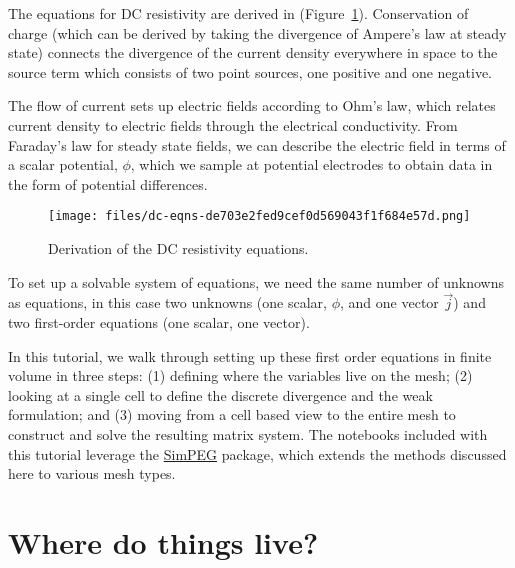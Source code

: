 \documentclass[Journal,InsideFigs,DoubleSpace,12pt,letterpaper]{ascelike-new}
\begin{document}
The equations for DC resistivity are derived in (Figure~\ref{dc-eqns}). Conservation of charge (which can be derived by taking the divergence of Ampere's law at steady state) connects the divergence of the current density everywhere in space to the source term which consists of two point sources, one positive and one negative.

The flow of current sets up electric fields according to Ohm's law, which relates current density to electric fields through the electrical conductivity. From Faraday's law for steady state fields, we can describe the electric field in terms of a scalar potential, $\phi$, which we sample at potential electrodes to obtain data in the form of potential differences.

\begin{figure}[!htbp]
\centering
\texttt{[image: files/dc-eqns-de703e2fed9cef0d569043f1f684e57d.png]}
\caption{Derivation of the DC resistivity equations.}
\label{dc-eqns}
\end{figure}

To set up a solvable system of equations, we need the same number of unknowns as equations, in this case two unknowns (one scalar, $\phi$, and one vector $\vec{j}$) and two first-order equations (one scalar, one vector).

In this tutorial, we walk through setting up these first order equations in finite volume in three steps: (1) defining where the variables live on the mesh; (2) looking at a single cell to define the discrete divergence and the weak formulation; and (3) moving from a cell based view to the entire mesh to construct and solve the resulting matrix system. The notebooks included with this tutorial leverage the \href{http://simpeg.xyz/}{SimPEG} package, which extends the methods discussed here to various mesh types.

\section{Where do things live?}\label{Where do things live?}
\end{document}
